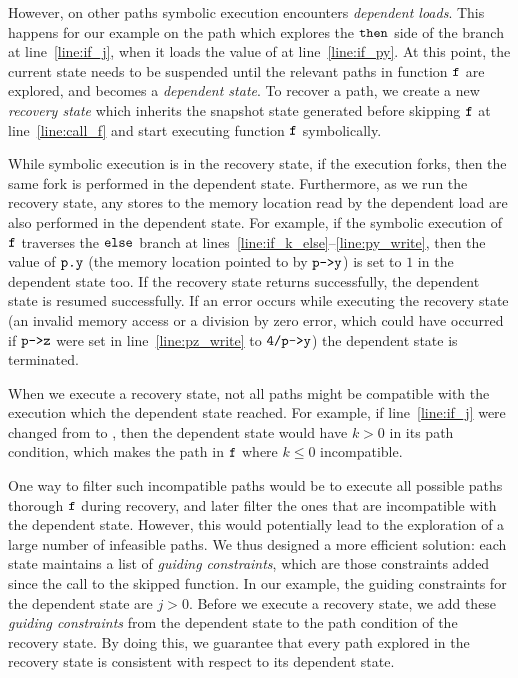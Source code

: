 However, on other paths symbolic execution encounters
\textit{dependent loads}.  This happens for our example on the path
which explores the $\texttt{then}$ side of the branch at
line~\ref{line:if_j}, when it loads the value of  at
line~\ref{line:if_py}. At this point, the current state needs to be
suspended until the relevant paths in function $\texttt{f}$ are
explored, and becomes a \textit{dependent state}. To recover a path,
we create a new \textit{recovery state} which inherits the snapshot
state generated before skipping $\texttt{f}$ at line~\ref{line:call_f}
and start executing function $\texttt{f}$ symbolically.

While symbolic execution is in the recovery state, if the execution
forks, then the same fork is performed in the dependent state.
Furthermore, as we run the recovery state, any stores to the memory
location read by the dependent load are also performed in the
dependent state. For example, if the symbolic execution of $\texttt{f}$
traverses the $\texttt{else}$ branch at
lines~\ref{line:if_k_else}--\ref{line:py_write}, then the value of
$\texttt{p.y}$ (the memory location pointed to by $\texttt{p->y}$) is set
to $1$ in the dependent state too. If the recovery state returns
successfully, the dependent state is resumed successfully. If an error
occurs while executing the recovery state (\eg an invalid memory
access or a division by zero error, which could have occurred if
$\texttt{p->z}$ were set in line~\ref{line:pz_write} to $\texttt{4/p->y}$)
the dependent state is terminated.

When we execute a recovery state, not all paths might be compatible
with the execution which the dependent state reached. For example, if
line~\ref{line:if_j} were changed from  to , then the dependent state would have $k>0$ in its path condition, 
which makes the path in $\texttt{f}$ where $k \le 0$ incompatible.

One way to filter such incompatible paths would be to execute all
possible paths thorough $\texttt{f}$ during recovery, and later filter
the ones that are incompatible with the dependent state. However, this
would potentially lead to the exploration of a large number of
infeasible paths. We thus designed a more efficient solution:
each state maintains a list of \textit{guiding constraints}, which are
those constraints added since the call to the skipped function. In our
example, the guiding constraints for the dependent state are
$j>0$. Before we execute a recovery state, we add these
\textit{guiding constraints} from the dependent state to the path
condition of the recovery state. By doing this, we guarantee that
every path explored in the recovery state is consistent with respect
to its dependent state.

